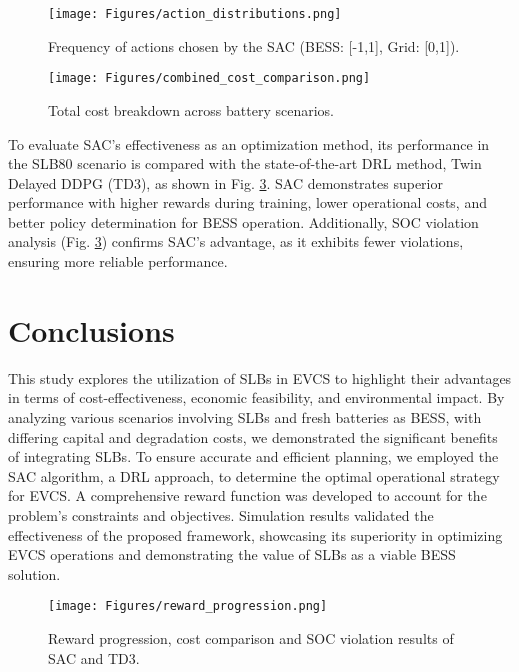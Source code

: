 \documentclass[10pt, journal]{IEEEtran}
\begin{document}
{\setlength{\belowcaptionskip}{-8mm}
\begin{figure}[ht]
\centering
\texttt{[image: Figures/action\_distributions.png]}
\caption{Frequency of actions chosen by the SAC (BESS: [-1,1], Grid: [0,1]).}
\label{Fig_r4}
\end{figure}}

{\setlength{\belowcaptionskip}{-3mm}
\begin{figure}[ht]
\centering
\texttt{[image: Figures/combined\_cost\_comparison.png]}
\caption{Total cost breakdown across battery scenarios.}
\label{Fig_r3}
\end{figure}}

To evaluate SAC's effectiveness as an optimization method, its performance in the SLB80 scenario is compared with the state-of-the-art DRL method, Twin Delayed DDPG (TD3), as shown in Fig. \ref{Fig_r4}. SAC demonstrates superior performance with higher rewards during training, lower operational costs, and better policy determination for BESS operation. Additionally, SOC violation analysis (Fig. \ref{Fig_r4}) confirms SAC’s advantage, as it exhibits fewer violations, ensuring more reliable performance.

\vspace{-8mm}
\section{Conclusions}
This study explores the utilization of SLBs in EVCS to highlight their advantages in terms of cost-effectiveness, economic feasibility, and environmental impact. By analyzing various scenarios involving SLBs and fresh batteries as BESS, with differing capital and degradation costs, we demonstrated the significant benefits of integrating SLBs. To ensure accurate and efficient planning, we employed the SAC algorithm, a DRL approach, to determine the optimal operational strategy for EVCS. A comprehensive reward function was developed to account for the problem's constraints and objectives. Simulation results validated the effectiveness of the proposed framework, showcasing its superiority in optimizing EVCS operations and demonstrating the value of SLBs as a viable BESS solution.

{\setlength{\belowcaptionskip}{-9mm}
\begin{figure}[ht]
\centering
\texttt{[image: Figures/reward\_progression.png]}
\vspace{-2mm}
\caption{Reward progression, cost comparison and SOC violation results of SAC and TD3.}
\label{Fig_r4}
\end{figure}}

\vspace{-4mm}
\footnotesize


\end{document}
